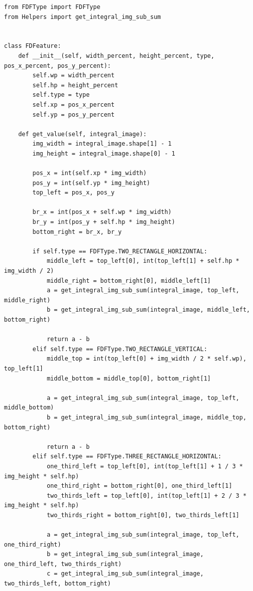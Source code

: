 \begin{lstlisting}[style=py]
from FDFType import FDFType
from Helpers import get_integral_img_sub_sum


class FDFeature:
    def __init__(self, width_percent, height_percent, type, pos_x_percent, pos_y_percent):
        self.wp = width_percent
        self.hp = height_percent
        self.type = type
        self.xp = pos_x_percent
        self.yp = pos_y_percent

    def get_value(self, integral_image):
        img_width = integral_image.shape[1] - 1
        img_height = integral_image.shape[0] - 1

        pos_x = int(self.xp * img_width)
        pos_y = int(self.yp * img_height)
        top_left = pos_x, pos_y

        br_x = int(pos_x + self.wp * img_width)
        br_y = int(pos_y + self.hp * img_height)
        bottom_right = br_x, br_y

        if self.type == FDFType.TWO_RECTANGLE_HORIZONTAL:
            middle_left = top_left[0], int(top_left[1] + self.hp * img_width / 2)
            middle_right = bottom_right[0], middle_left[1]
            a = get_integral_img_sub_sum(integral_image, top_left, middle_right)
            b = get_integral_img_sub_sum(integral_image, middle_left, bottom_right)

            return a - b
        elif self.type == FDFType.TWO_RECTANGLE_VERTICAL:
            middle_top = int(top_left[0] + img_width / 2 * self.wp), top_left[1]
            middle_bottom = middle_top[0], bottom_right[1]

            a = get_integral_img_sub_sum(integral_image, top_left, middle_bottom)
            b = get_integral_img_sub_sum(integral_image, middle_top, bottom_right)

            return a - b
        elif self.type == FDFType.THREE_RECTANGLE_HORIZONTAL:
            one_third_left = top_left[0], int(top_left[1] + 1 / 3 * img_height * self.hp)
            one_third_right = bottom_right[0], one_third_left[1]
            two_thirds_left = top_left[0], int(top_left[1] + 2 / 3 * img_height * self.hp)
            two_thirds_right = bottom_right[0], two_thirds_left[1]

            a = get_integral_img_sub_sum(integral_image, top_left, one_third_right)
            b = get_integral_img_sub_sum(integral_image, one_third_left, two_thirds_right)
            c = get_integral_img_sub_sum(integral_image, two_thirds_left, bottom_right)


\end{lstlisting}
